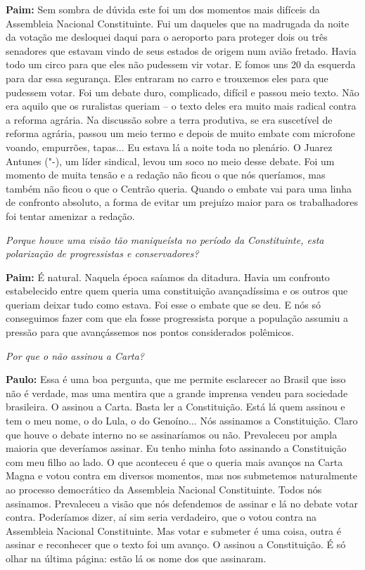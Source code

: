 \textbf{Paim:} Sem sombra de dúvida este foi um dos momentos mais
difíceis da Assembleia Nacional Constituinte. Fui um daqueles que na
madrugada da noite da votação me desloquei daqui para o aeroporto para
proteger dois ou três senadores que estavam vindo de seus estados de
origem num avião fretado. Havia todo um circo para que eles não pudessem
vir votar. E fomos uns 20 da esquerda para dar essa segurança. Eles
entraram no carro e trouxemos eles para que pudessem votar. Foi um
debate duro, complicado, difícil e passou meio texto. Não era aquilo que
os ruralistas queriam -- o texto deles era muito mais radical contra a
reforma agrária. Na discussão sobre a terra produtiva, se era suscetível
de reforma agrária, passou um meio termo e depois de muito embate com
microfone voando, empurrões, tapas... Eu estava lá a noite toda no
plenário. O Juarez Antunes ("-), um líder sindical, levou um soco no
meio desse debate. Foi um momento de muita tensão e a redação não ficou
o que nós queríamos, mas também não ficou o que o Centrão queria. Quando
o embate vai para uma linha de confronto absoluto, a forma de evitar um
prejuízo maior para os trabalhadores foi tentar amenizar a redação.

\emph{Porque houve uma visão tão maniqueísta no período da
Constituinte, esta polarização de progressistas e conservadores?}

\textbf{Paim:} É natural. Naquela época saíamos da ditadura. Havia um
confronto estabelecido entre quem queria uma constituição avançadíssima
e os outros que queriam deixar tudo como estava. Foi esse o embate que
se deu. E nós só conseguimos fazer com que ela fosse progressista porque
a população assumiu a pressão para que avançássemos nos pontos
considerados polêmicos.

\emph{Por que o  não assinou a Carta?}

\textbf{Paulo:} Essa é uma boa pergunta, que me permite esclarecer ao
Brasil que isso não é verdade, mas uma mentira que a grande imprensa
vendeu para sociedade brasileira. O  assinou a Carta. Basta ler a
Constituição. Está lá quem assinou e tem o meu nome, o do Lula, o do
Genoíno... Nós assinamos a Constituição. Claro que houve o debate
interno no  se assinaríamos ou não. Prevaleceu por ampla maioria que
deveríamos assinar. Eu tenho minha foto assinando a Constituição com meu
filho ao lado. O que aconteceu é que o  queria mais avanços na Carta
Magna e votou contra em diversos momentos, mas nos submetemos
naturalmente ao processo democrático da Assembleia Nacional
Constituinte. Todos nós assinamos. Prevaleceu a visão que nós defendemos
de assinar e lá no debate votar contra. Poderíamos dizer, aí sim seria
verdadeiro, que o  votou contra na Assembleia Nacional Constituinte.
Mas votar e submeter é uma coisa, outra é assinar e reconhecer que o
texto foi um avanço. O  assinou a Constituição. É só olhar na última
página: estão lá os nome dos que assinaram.

